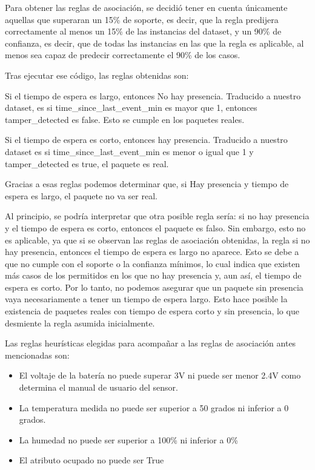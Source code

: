 Para obtener las reglas de asociación, se decidió tener en cuenta únicamente aquellas que superaran un 15\% de soporte, es decir, que la regla predijera correctamente al menos un 15\% de las instancias del dataset, y un 90\% de confianza, es decir, que de todas las instancias en las que la regla es aplicable, al menos sea capaz de predecir correctamente el 90\% de los casos.


Tras ejecutar ese código, las reglas obtenidas son:


Si el tiempo de espera es largo, entonces No hay presencia.
Traducido a nuestro dataset, es si time\_since\_last\_event\_min es mayor que 1, entonces tamper\_detected es false. Esto se cumple en los paquetes reales.

Si el tiempo de espera es corto, entonces hay presencia.
Traducido a nuestro dataset es si time\_since\_last\_event\_min es menor o igual que 1 y tamper\_detected es true, el paquete es real.

Gracias a esas reglas podemos determinar que, si Hay presencia y tiempo de espera es largo, el paquete no va ser real.

Al principio, se podría interpretar que otra posible regla sería: si no hay presencia y el tiempo de espera es corto, entonces el paquete es falso. Sin embargo, esto no es aplicable, ya que si se observan las reglas de asociación obtenidas, la regla si no hay presencia, entonces el tiempo de espera es largo no aparece.
Esto se debe a que no cumple con el soporte o la confianza mínimos, lo cual indica que existen más casos de los permitidos en los que no hay presencia y, aun así, el tiempo de espera es corto.
Por lo tanto, no podemos asegurar que un paquete sin presencia vaya necesariamente a tener un tiempo de espera largo. Esto hace posible la existencia de paquetes reales con tiempo de espera corto y sin presencia, lo que desmiente la regla asumida inicialmente.


Las reglas heurísticas elegidas para acompañar a las reglas de asociación antes mencionadas son: 

\begin{itemize}
    \item El voltaje de la batería no puede superar 3V ni puede ser menor 2.4V como determina el manual de usuario del sensor.
    \item La temperatura medida no puede ser superior a 50 grados ni inferior a 0 grados.
    \item La humedad no puede ser superior a 100\% ni inferior a 0\%
    \item El atributo ocupado no puede ser True
\end{itemize}

